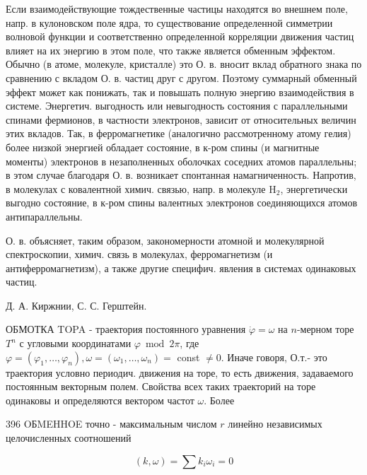 \documentclass[10pt]{article}
\begin{document}
Если взаимодействующие тождественные частицы находятся во внешнем поле, напр. в кулоновском поле ядра, то существование определенной симметрии волновой функции и соответственно определенной корреляции движения частиц влияет на их энергию в этом поле, что также является обменным эффектом. Обычно (в атоме, молекуле, кристалле) это О. в. вносит вклад обратного знака по сравнению с вкладом О. в. частиц друг с другом. Поэтому суммарный обменный эффект может как понижать, так и повышать полную энергию взаимодействия в системе. Энергетич. выгодность или невыгодность состояния с параллельными спинами фермионов, в частности электронов, зависит от относительных величин этих вкладов. Так, в ферромагнетике (аналогично рассмотренному атому гелия) более низкой энергией обладает состояние, в к-ром спины (и магнитные моменты) электронов в незаполненных оболочках соседних атомов параллельны; в этом случае благодаря О. в. возникает спонтанная намагниченность. Напротив, в молекулах с ковалентной химич. связью, напр. в молекуле $\mathrm{H}_{2}$, энергетически выгодно состояние, в к-ром спины валентных электронов соединяющихся атомов антипараллельны.



О. в. объясняет, таким образом, закономерности атомной и молекулярной спектроскопии, химич. связь в молекулах, ферромагнетизм (и антиферромагнетизм), а также другие специфич. явления в системах одинаковых частиц.



Д. А. Киржнии, С. С. Герштейн.



ОБМОТКА TOPA - траектория постоянного уравнения $\dot{\varphi}=\omega$ на $n$-мерном торе $T^{n}$ с угловыми координатами $\varphi \bmod 2 \pi$, где $\varphi=\left(\varphi_{1}, \ldots, \varphi_{n}\right), \omega=\left(\omega_{1}, \ldots, \omega_{n}\right)=$ const $\neq 0$. Иначе говоря, О.т.- это траектория условно периодич. движения на торе, то есть движения, задаваемого постоянным векторным полем. Свойства всех таких траекторий на торе одинаковы и определяются вектором частот $\omega$. Более



396 OБMEHHOE точно - максимальным числом $r$ линейно независимых целочисленных соотношений



\[

(k, \omega)=\sum k_{i} \omega_{i}=0

\]
\end{document}
